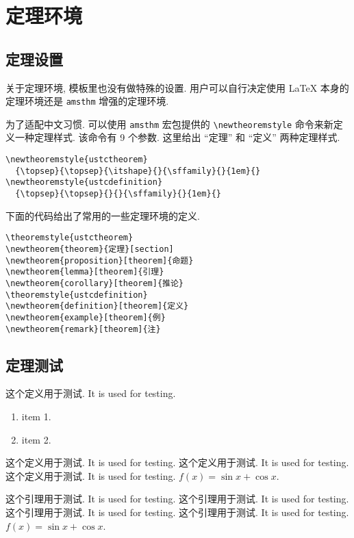 \chapter{定理环境}

\section{定理设置}

关于定理环境, 模板里也没有做特殊的设置. 用户可以自行决定使用 \LaTeX{} 本身的定理环境还是 \verb|amsthm| 增强的定理环境.

为了适配中文习惯. 可以使用 \verb|amsthm| 宏包提供的 \verb|\newtheoremstyle| 命令来新定义一种定理样式. 该命令有 9 个参数. 这里给出 ``定理'' 和 ``定义'' 两种定理样式.
\begin{verbatim}
\newtheoremstyle{ustctheorem}
  {\topsep}{\topsep}{\itshape}{}{\sffamily}{}{1em}{}
\newtheoremstyle{ustcdefinition}
  {\topsep}{\topsep}{}{}{\sffamily}{}{1em}{}
\end{verbatim}

下面的代码给出了常用的一些定理环境的定义.
\begin{verbatim}
\theoremstyle{ustctheorem}
\newtheorem{theorem}{定理}[section]
\newtheorem{proposition}[theorem]{命题}
\newtheorem{lemma}[theorem]{引理}
\newtheorem{corollary}[theorem]{推论}
\theoremstyle{ustcdefinition}
\newtheorem{definition}[theorem]{定义}
\newtheorem{example}[theorem]{例}
\newtheorem{remark}[theorem]{注}
\end{verbatim}

\section{定理测试}

\begin{definition}[option]\label{def:test}
  这个定义用于测试. It is used for testing.
  \begin{enumerate}
    \item item 1.
    \item item 2.
  \end{enumerate}
  这个定义用于测试. It is used for testing. 这个定义用于测试. It is used for testing. 这个定义用于测试. It is used for testing. $f(x)=\sin x + \cos x$.
\end{definition}

\begin{lemma}\label{lem:test}
  这个引理用于测试. It is used for testing. 这个引理用于测试. It is used for testing. 这个引理用于测试. It is used for testing. 这个引理用于测试. It is used for testing. $f(x)=\sin x + \cos x$.
\end{lemma}

